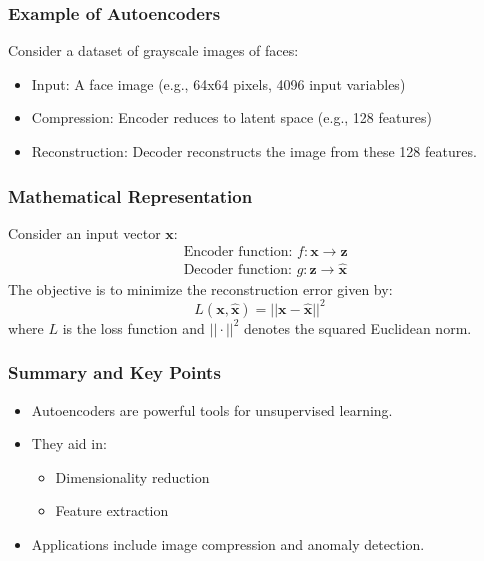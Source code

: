 \documentclass[aspectratio=169]{beamer}
\begin{document}
\begin{frame}[fragile]
    \frametitle{Example of Autoencoders}
    Consider a dataset of grayscale images of faces:
    \begin{itemize}
        \item Input: A face image (e.g., 64x64 pixels, 4096 input variables)
        \item Compression: Encoder reduces to latent space (e.g., 128 features)
        \item Reconstruction: Decoder reconstructs the image from these 128 features.
    \end{itemize}
\end{frame}

\begin{frame}[fragile]
    \frametitle{Mathematical Representation}
    Consider an input vector $\mathbf{x}$:
    \begin{align*}
        & \text{Encoder function: } f: \mathbf{x} \rightarrow \mathbf{z} \\
        & \text{Decoder function: } g: \mathbf{z} \rightarrow \hat{\mathbf{x}}
    \end{align*}
    The objective is to minimize the reconstruction error given by:
    \begin{equation}
        L(\mathbf{x}, \hat{\mathbf{x}}) = ||\mathbf{x} - \hat{\mathbf{x}}||^2
    \end{equation}
    where \( L \) is the loss function and \( ||\cdot||^2 \) denotes the squared Euclidean norm.
\end{frame}

\begin{frame}[fragile]
    \frametitle{Summary and Key Points}
    \begin{itemize}
        \item Autoencoders are powerful tools for unsupervised learning.
        \item They aid in:
        \begin{itemize}
            \item Dimensionality reduction
            \item Feature extraction
        \end{itemize}
        \item Applications include image compression and anomaly detection.
    \end{itemize}
\end{frame}
\end{document}
